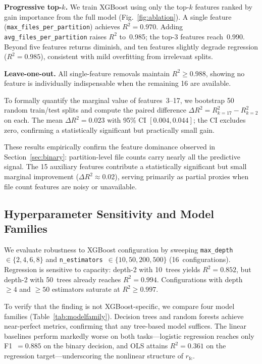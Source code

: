 \documentclass[conference, 10pt]{IEEEtran}
\begin{document}
\textbf{Progressive top-$k$.} We train XGBoost using only the top-$k$
features ranked by gain importance from the full model
(Fig.~\ref{fig:ablation}). A single feature
(\texttt{max\_files\_per\_partition}) achieves
$R^2 = 0.970$. Adding \texttt{avg\_files\_per\_partition} raises
$R^2$ to~0.985; the top-3 features reach~0.990. Beyond five features
returns diminish, and ten features slightly degrade regression
($R^2 = 0.985$), consistent with mild overfitting from irrelevant
splits.

\textbf{Leave-one-out.} All single-feature removals maintain
$R^2 \geq 0.988$, showing no feature is individually indispensable
when the remaining 16 are available.

To formally quantify the marginal value of features~3--17, we bootstrap
50 random train/test splits and compute the paired difference
$\Delta R^2 = R^2_{k=17} - R^2_{k=2}$ on each.
The mean $\Delta R^2 = 0.023$ with 95\% CI $[0.004, 0.044]$;
the CI excludes zero, confirming a statistically significant
but practically small gain.

These results empirically confirm the feature dominance observed in
Section~\ref{sec:binary}: partition-level file counts carry nearly all the
predictive signal. The 15 auxiliary features contribute a
statistically significant but small marginal improvement
($\Delta R^2 \approx 0.02$), serving primarily as partial proxies
when file count features are noisy or unavailable.

\subsection{Hyperparameter Sensitivity and Model Families}
\label{sec:sensitivity}

We evaluate robustness to XGBoost configuration by sweeping
\texttt{max\_depth}~$\in \{2, 4, 6, 8\}$ and
\texttt{n\_estimators}~$\in \{10, 50, 200, 500\}$
(16~configurations). Regression is sensitive to capacity:
depth-2 with 10~trees
yields $R^2 = 0.852$, but depth-2 with 50~trees already reaches
$R^2 = 0.994$. Configurations with depth~$\geq 4$ and $\geq 50$
estimators saturate at $R^2 \geq 0.997$.

To verify that the finding is not XGBoost-specific, we compare four
model families (Table~\ref{tab:modelfamily}). Decision trees and
random forests achieve near-perfect metrics, confirming that any
tree-based model suffices. The linear baselines perform markedly
worse on both tasks---logistic regression reaches only
F1~$= 0.885$ on the binary decision, and OLS attains
$R^2 = 0.361$ on the regression target---underscoring the
nonlinear structure of $r_\mathrm{fc}$.
\end{document}
